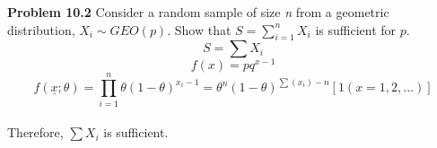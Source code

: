 
{\bf Problem 10.2} Consider a random sample of size \textit{n} from a geometric distribution, $ X_{i} \sim GEO(p). $ Show that $ S=\sum_{i=1}^{n}X_{i} $ is sufficient for $ p. $ 
\\ \[ S=\sum X_{i}\] \[f(x)=pq^{x-1}\] \[f( \underline{x}; \theta )=\prod_{i=1}^{n} \theta (1- \theta )^{x_{i}-1}= \theta^{n} (1- \theta )^{\sum (x_{i})-n}[1(x=1,2,...)] \]
\\ Therefore, $ \sum X_{i} $ is sufficient.
